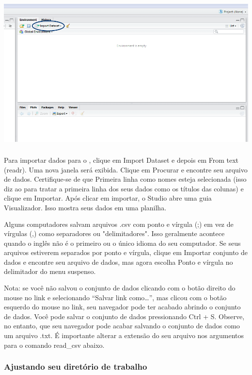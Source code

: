 \documentclass{article}
\begin{document}
\includegraphics[width=14cm,height=8cm]{rstudio2.png}


Para importar dados para o \faRProject, clique em Import Dataset e depois em From text (readr). Uma nova janela será exibida. Clique em Procurar e encontre seu arquivo de dados. Certifique-se de que Primeira linha como nomes esteja selecionada (isso diz ao \faRProject para tratar a primeira linha dos seus dados como os títulos das colunas) e clique em Importar. Após clicar em importar, o \faRProject Studio abre uma guia Visualizador. Isso mostra seus dados em uma planilha.

Alguns computadores salvam arquivos .csv com ponto e vírgula (;) em vez de vírgulas (,) como separadores ou "delimitadores". Isso geralmente acontece quando o inglês não é o primeiro ou o único idioma do seu computador. Se seus arquivos estiverem separados por ponto e vírgula, clique em Importar conjunto de dados e encontre seu arquivo de dados, mas agora escolha Ponto e vírgula no delimitador do menu suspenso.

Nota: se você não salvou o conjunto de dados clicando com o botão direito do mouse no link e selecionando “Salvar link como…”, mas clicou com o botão esquerdo do mouse no link, seu navegador pode ter acabado abrindo o conjunto de dados. Você pode salvar o conjunto de dados pressionando Ctrl + S. Observe, no entanto, que seu navegador pode acabar salvando o conjunto de dados como um arquivo .txt. É importante alterar a extensão do seu arquivo nos argumentos para o comando read\_csv abaixo.

\subsubsection{Ajustando seu diretório de trabalho}
\end{document}
